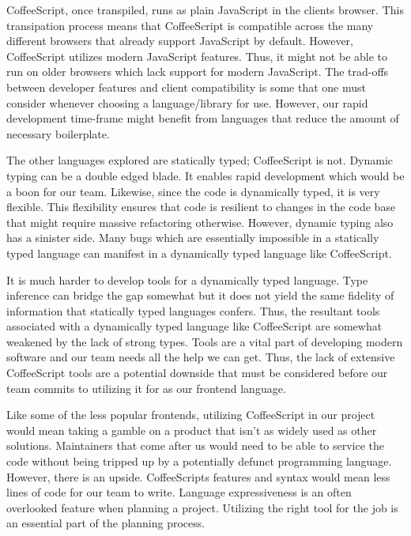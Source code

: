 \documentclass[12pt]{article}
\begin{document}
CoffeeScript, once transpiled, runs as plain JavaScript in the clients browser.\cite{coffeescriptguide} This transipation process means that CoffeeScript is compatible across the many different browsers that already support JavaScript by default. However, CoffeeScript utilizes modern JavaScript features.\cite{coffeescriptguide} Thus, it might not be able to run on older browsers which lack support for modern JavaScript. The trad-offs between developer features and client compatibility is some that one must consider whenever choosing a language/library for use. However, our rapid development time-frame might benefit from languages that reduce the amount of necessary boilerplate.

The other languages explored are statically typed; CoffeeScript is not. Dynamic typing can be a double edged blade. It enables rapid development which would be a boon for our team. Likewise, since the code is dynamically typed, it is very flexible. This flexibility ensures that code is resilient to changes in the code base that might require massive refactoring otherwise. However, dynamic typing also has a sinister side. Many bugs which are essentially impossible in a statically typed language can manifest in a dynamically typed language like CoffeeScript.

It is much harder to develop tools for a dynamically typed language. Type inference can bridge the gap somewhat but it does not yield the same fidelity of information that statically typed languages confers. Thus, the resultant tools associated with a dynamically typed language like CoffeeScript are somewhat weakened by the lack of strong types. Tools are a vital part of developing modern software and our team needs all the help we can get. Thus, the lack of extensive CoffeeScript tools are a potential downside that must be considered before our team commits to utilizing it for as our frontend language.

Like some of the less popular frontends, utilizing CoffeeScript in our project would mean taking a gamble on a product that isn't as widely used as other solutions. Maintainers that come after us would need to be able to service the code without being tripped up by a potentially defunct programming language. However, there is an upside. CoffeeScripts features and syntax would mean less lines of code for our team to write. Language expressiveness is an often overlooked feature when planning a project. Utilizing the right tool for the job is an essential part of the planning process.
\end{document}

